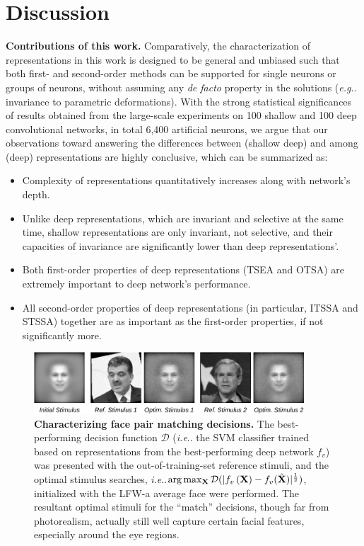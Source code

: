 \documentclass[fleqn]{article} %
\makeatletter
\DeclareRobustCommand\onedot{\futurelet\@let@token\@onedot}
\def\@onedot{\ifx\@let@token.\else.\null\fi\xspace}
\def\eg{\emph{e.g}\onedot} \def\Eg{\emph{E.g}\onedot}
\def\ie{\emph{i.e}\onedot} \def\Ie{\emph{I.e}\onedot}
\makeatother
\begin{document}
\section{Discussion}

{\bf Contributions of this work.}
Comparatively, the characterization of representations in this work is designed to be general and unbiased such that both first- and second-order methods can be supported for single neurons or groups of neurons, without assuming any \emph{de facto} property in the solutions (\eg invariance to parametric deformations).
With the strong statistical significances of results obtained from the large-scale experiments on 100 shallow and 100 deep convolutional networks, in total 6,400 artificial neurons, we argue that our observations toward answering the differences between (shallow \vs deep) and among (deep) representations are highly conclusive, which can be summarized as:
\begin{itemize}[leftmargin=*] %
\item Complexity of representations quantitatively increases along with network's depth.
\item Unlike deep representations, which are invariant and selective at the same time, shallow representations are only invariant, not selective, and their capacities of invariance are significantly lower than deep representations'.
\item Both first-order properties of deep representations (TSEA and OTSA) are extremely important to deep network's performance.
\item All second-order properties of deep representations (in particular, ITSSA and STSSA) together are as important as the first-order properties, if not significantly more.
\end{itemize}

\begin{figure}[t]
\centering \includegraphics[width=0.90\textwidth]{Figs/whole_face.pdf}
\caption{{\bf Characterizing face pair matching decisions.}
The best-performing decision function $\mathcal{D}$ (\ie the SVM classifier trained based on representations from the best-performing deep network $f_v$) {was} presented with the out-of-training-set reference stimuli, and the optimal stimulus searches, \ie $\arg\max_{\bf{X}}\mathcal{D}(| f_v\left({\bf{X}}\right) - f_v(\tilde{\bf{X}}) |^\frac{1}{2})$, initialized with the LFW-a average face {were} performed.
The resultant optimal stimuli for the ``match'' decisions, though far from photorealism, actually still well capture certain facial features, especially around the eye regions\protect\footnotemark.
}
\label{fig:wface}
\end{figure}
\end{document}
